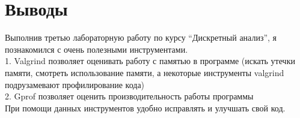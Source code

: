 \section{Выводы}

Выполнив третью лабораторную работу по курсу \enquote{Дискретный анализ}, я познакомился
с очень полезными инструментами.
\\1. Valgrind позволяет оценивать работу с памятью в программе (искать утечки памяти, смотреть использование памяти,
а некоторые инструменты valgrind подрузамевают профилирование кода)
\\2. Gprof позволяет оценить производительность работы программы
\\При помощи данных инструментов удобно исправлять и улучшать свой код.
\pagebreak
